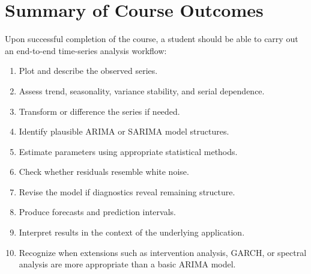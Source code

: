 \documentclass[11pt]{article}
\begin{document}
\section{Summary of Course Outcomes}

Upon successful completion of the course, a student should be able to carry out
an end-to-end time-series analysis workflow:

\begin{enumerate}
    \item Plot and describe the observed series.
    \item Assess trend, seasonality, variance stability, and serial dependence.
    \item Transform or difference the series if needed.
    \item Identify plausible ARIMA or SARIMA model structures.
    \item Estimate parameters using appropriate statistical methods.
    \item Check whether residuals resemble white noise.
    \item Revise the model if diagnostics reveal remaining structure.
    \item Produce forecasts and prediction intervals.
    \item Interpret results in the context of the underlying application.
    \item Recognize when extensions such as intervention analysis, GARCH, or
    spectral analysis are more appropriate than a basic ARIMA model.
\end{enumerate}
\end{document}
